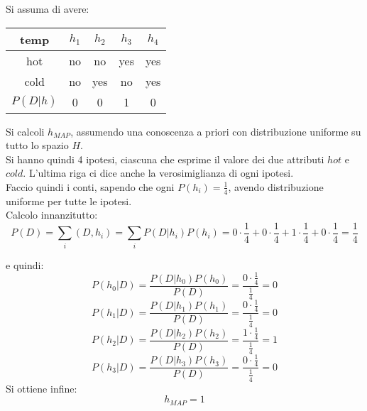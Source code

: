 \begin{esercizio}
  Si assuma di avere:
  \begin{table}[H]
    \centering
    \begin{tabular}{c||c|c|c|c}
      temp & $h_1$ & $h_2$ & $h_3$ & $h_4$\\
      \hline
      \hline
      hot & no & no & yes & yes\\
      cold & no &yes & no & yes \\
      \hline
      \hline
      $P(D|h)$ & 0 & 0 & 1 &0
    \end{tabular}
  \end{table}
  Si calcoli $h_{MAP}$, assumendo una conoscenza a priori con distribuzione
  uniforme su tutto lo spazio $H$.\\
  Si hanno quindi 4 ipotesi, ciascuna che esprime il valore dei due attributi
  $hot $ e $cold$. L'ultima riga ci dice anche la verosimiglianza di ogni
  ipotesi.\\
  Faccio quindi i conti, sapendo che ogni $P(h_i)=\frac{1}{4}$, avendo
  distribuzione uniforme per tutte le ipotesi.\\
  Calcolo innanzitutto:
  \[P(D)=\sum_i(D, h_i)=\sum_i
    P(D|h_i)P(h_i)=0\cdot\frac{1}{4}+0\cdot\frac{1}{4}+
    1\cdot\frac{1}{4}+0\cdot\frac{1}{4}=\frac{1}{4}\]
  
  e quindi:
  \[P(h_0|D)=\frac{P(D|h_0)P(h_0)}{P(D)}=
    \frac{0\cdot\frac{1}{4}}{\frac{1}{4}}=0\]
  \[P(h_1|D)=\frac{P(D|h_1)P(h_1)}{P(D)}=
    \frac{0\cdot\frac{1}{4}}{\frac{1}{4}}=0\]
  \[P(h_2|D)=\frac{P(D|h_2)P(h_2)}{P(D)}=
    \frac{1\cdot\frac{1}{4}}{\frac{1}{4}}=1\]
  \[P(h_3|D)=\frac{P(D|h_3)P(h_3)}{P(D)}=
    \frac{0\cdot\frac{1}{4}}{\frac{1}{4}}=0\]
  Si ottiene infine:
  \[h_{MAP}=1\]
\end{esercizio}
